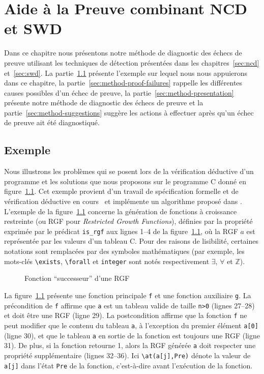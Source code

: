 
\chapter{Aide à la Preuve combinant NCD et SWD}
\label{sec:method}

\chapterintro


Dans ce chapitre nous présentons notre méthode de diagnostic des échecs de
preuve utilisant les techniques de détection présentées dans les
chapitres~\ref{sec:ncd} et~\ref{sec:swd}.
La partie~\ref{sec:method-ex} présente l'exemple sur lequel nous nous
appuierons dans ce chapitre, la partie~\ref{sec:method-proof-failures} rappelle
les différentes causes possibles d'un échec de preuve, la
partie~\ref{sec:method-presentation} présente notre méthode de diagnostic des
échecs de preuve et la partie~\ref{sec:method-suggestions} suggère les actions
à effectuer après qu'un échec de preuve ait été diagnostiqué.


\section{Exemple}
\label{sec:method-ex}


Nous illustrons les problèmes qui se posent lors de la vérification déductive
d'un programme et les solutions que nous proposons sur le programme C donné en
figure~\ref{fig:rgf1}.
Cet exemple provient d'un travail de spécification formelle et de vérification
déductive en cours~\cite{Genestier/TAP15} et implémente un algorithme proposé
dans \cite[page 235]{Arndt/10}.
L'exemple de la figure~\ref{fig:rgf1} concerne la génération de fonctions à
croissance restreinte (ou RGF pour \textit{Restricted Growth Functions}),
définies par la propriété exprimée par le prédicat \acsl \lstinline{is_rgf} aux
lignes 1--4 de la figure~\ref{fig:rgf1}, où la RGF $a$ est représentée par les
valeurs d'un tableau C.
Pour des raisons de lisibilité, certaines notations \acsl sont remplacées par
des symboles mathématiques (par exemple, les mots-clés
\lstinline[style=c]{\exists}, \lstinline[style=c]{\forall} et
\lstinline[style=c]{integer} sont notés respectivement $\exists$, $\forall$ et
$\mathbb{Z}$).


\begin{figure}[tb]
  \centering
  
  \caption{Fonction ``successeur'' d'une RGF \label{fig:rgf1}}
\end{figure}


La figure~\ref{fig:rgf1} présente une fonction principale \lstinline{f} et une
fonction auxiliaire \lstinline{g}.
La précondition de \lstinline{f} affirme que \lstinline{a} est un tableau
valide de taille \lstinline{n>0} (lignes 27--28) et doit être une RGF
(ligne 29).
La postcondition affirme que la fonction \lstinline'f' ne peut modifier que le
contenu du tableau \lstinline{a}, à l'exception du premier élément
\lstinline{a[0]} (ligne 30), et que le tableau \lstinline{a} en sortie de la
fonction est toujours une RGF (ligne 31).
De plus, si la fonction retourne 1, alors la RGF générée \lstinline{a} doit
respecter une propriété supplémentaire (lignes 32--36).
Ici \lstinline{\at(a[j],Pre)} dénote la valeur de \lstinline{a[j]} dans l'état 
\lstinline{Pre} de la fonction, c'est-à-dire avant l'exécution de la fonction.


